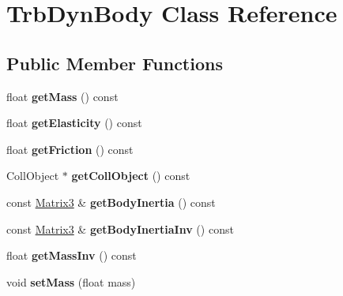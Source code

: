 \hypertarget{class_trb_dyn_body}{\section{Trb\+Dyn\+Body Class Reference}
\label{class_trb_dyn_body}
}
\subsection*{Public Member Functions}
\begin{DoxyCompactItemize}
\item 
\hypertarget{class_trb_dyn_body_a223473b1a6d8e18ec79cff9bee328584}{float {\bfseries get\+Mass} () const }\label{class_trb_dyn_body_a223473b1a6d8e18ec79cff9bee328584}

\item 
\hypertarget{class_trb_dyn_body_af4f232e77a6a2e3ad7611b03539a9140}{float {\bfseries get\+Elasticity} () const }\label{class_trb_dyn_body_af4f232e77a6a2e3ad7611b03539a9140}

\item 
\hypertarget{class_trb_dyn_body_a1881a59e1702b4d304e8281bdbd58336}{float {\bfseries get\+Friction} () const }\label{class_trb_dyn_body_a1881a59e1702b4d304e8281bdbd58336}

\item 
\hypertarget{class_trb_dyn_body_a6932b3d1e8022c560b70918c8ed25908}{Coll\+Object $\ast$ {\bfseries get\+Coll\+Object} () const }\label{class_trb_dyn_body_a6932b3d1e8022c560b70918c8ed25908}

\item 
\hypertarget{class_trb_dyn_body_a206af0a3bea9e04936bd5d2562a4779a}{const \hyperlink{class_vectormath_1_1_aos_1_1_matrix3}{Matrix3} \& {\bfseries get\+Body\+Inertia} () const }\label{class_trb_dyn_body_a206af0a3bea9e04936bd5d2562a4779a}

\item 
\hypertarget{class_trb_dyn_body_a38439db5a18163b0c104af03a4e822f5}{const \hyperlink{class_vectormath_1_1_aos_1_1_matrix3}{Matrix3} \& {\bfseries get\+Body\+Inertia\+Inv} () const }\label{class_trb_dyn_body_a38439db5a18163b0c104af03a4e822f5}

\item 
\hypertarget{class_trb_dyn_body_aa684f4d441676453ef37842899cdd9e9}{float {\bfseries get\+Mass\+Inv} () const }\label{class_trb_dyn_body_aa684f4d441676453ef37842899cdd9e9}

\item 
\hypertarget{class_trb_dyn_body_a5676b47154e66a90eab40e00b5b69361}{void {\bfseries set\+Mass} (float mass)}\label{class_trb_dyn_body_a5676b47154e66a90eab40e00b5b69361}


\end{DoxyCompactItemize}
